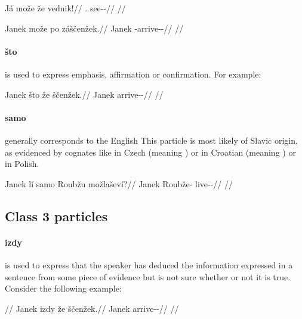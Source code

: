\pex
\begingl
	\gla Já može že vednik!//
	\glb \Second{}.\Sg{} \Add{} \Ipfv{} see-\Pv{}-\Pf{}//
	\glft {}//
\endgl
\xe

\pex
\begingl
	\gla Janek može po záščenžek.//
	\glb Janek \Add{} \Ipfv{} \Neg{}-arrive-\Av{}-\Pf{}//
	\glft {}//
\endgl
\xe


\paragraph{što}  is used to express emphasis, affirmation or confirmation. For example:

\pex
\begingl
	\gla Janek što že ščenžek.//
	\glb Janek \Aff{} \Pfv{} arrive-\Av{}-\Pf{}//
	\glft {}//
\endgl
\xe

\paragraph{samo}  generally corresponds to the English 
This particle is most likely of Slavic origin, as evidenced by cognates like
 in Czech (meaning ) or in Croatian (meaning
) or  in Polish.

\pex
\begingl
	\gla Janek lí samo Roubžu možlaševí?//
	\glb Janek \Q{} \Excl{} Roubže-\Ins{} live-\Av{}-\Cont{}//
	\glft {}//
\endgl
\xe

\subsection{Class 3 particles}\label{sec:class3-particles}

\paragraph{izdy}  is used to express that the speaker has deduced the
information expressed in a sentence from some piece of evidence but is not sure
whether or not it is true. Consider the following example:

\pex 
\begingl
	\glpreamble {}//
	\gla Janek izdy že ščenžek.//
	\glb Janek \Infer{} \Pfv{} arrive-\Av{}-\Pf{}//
	\glft {}//
\endgl
\xe

